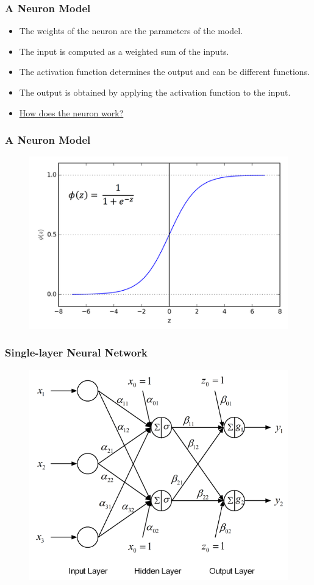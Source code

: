 \documentclass{beamer}
\begin{document}
\begin{frame}
	\frametitle{A Neuron Model}
\begin{itemize}
	\item The weights of the neuron are the parameters of the model.
	\item The input is computed as a weighted sum of the inputs.
	\item The activation function determines the output and can be different functions.
	\item The output is obtained by applying the activation function to the input.
	\item \href{https://appliedgo.net/perceptron/}{ \textcolor{pblue}{How does the neuron work?}}
\end{itemize}
\end{frame}

\begin{frame}
	\frametitle{A Neuron Model}
	\begin{figure}
		\includegraphics[width=0.8\linewidth]{sigmoid.png}
	\end{figure}
\end{frame}

\begin{frame}
	\frametitle{Single-layer Neural Network}
	\begin{figure}
		\includegraphics[width=0.8\linewidth]{singlelayer_network1.png}
	\end{figure}
\end{frame}
\end{document}
